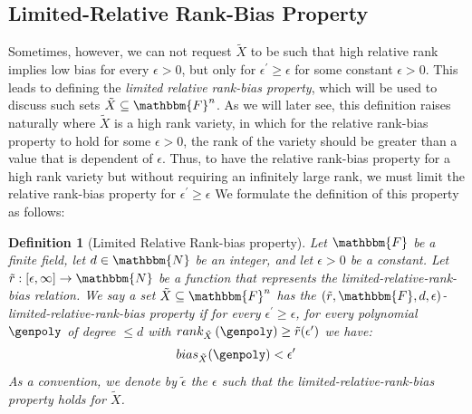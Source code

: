 \documentclass[10pt,a4paper]{article}
\newtheorem{definition}[theorem]{Definition}
\newcommand{\parens}[1]{\left( #1 \right)}
\newcommand{\basefield}[0]{\mathbbm{F}}
\newcommand{\blocklength}[0]{n}
\newcommand{\field}[0]{\basefield^{\blocklength}}
\newcommand{\degree}[0]{d}
\newcommand{\funcdef}[3]{#1:#2\rightarrow#3}
\newcommand{\naturalnumbersset}[0]{\mathbbm{N}}
\newcommand{\variety}{{\tilde{X}}}
\newcommand{\relrank}[2]{rank_{#1} \parens{#2}}
\newcommand{\rankbiasfunc}[0]{{\tilde{r}}}
\newcommand{\epsilonlimitedrankbias}[0]{{\tilde{\epsilon}}}
\newcommand{\relbias}[2]{bias_{#1}{({#2})}}
\begin{document}
\subsection[Limited Relative Rank-Bias Property]{Limited-Relative Rank-Bias Property}\label{subsec:limited-relative-rank-bias-property}
Sometimes, however, we can not request $\variety$ to be such that high relative rank implies low bias for every $\epsilon > 0$,
but only for $\epsilon^\prime \geq \epsilon$ for some constant $\epsilon > 0$.
This leads to defining the \emph{limited relative rank-bias property}, which will be used to discuss such sets $\variety \subseteq \field$.
\newline
As we will later see, this definition raises naturally where $\variety$ is a high rank variety,
in which for the relative rank-bias property to hold for some $\epsilon > 0$, the rank of the variety should be greater than a value that is dependent of $\epsilon$.
Thus, to have the relative rank-bias property for a high rank variety but without requiring an infinitely large rank, we must limit the relative rank-bias property for $\epsilon^\prime \geq \epsilon$
We formulate the definition of this property as follows:
\begin{definition}[Limited Relative Rank-bias property]
    Let $\basefield$ be a finite field, let $\degree \in \naturalnumbersset$ be an integer, and let $\epsilon > 0$ be a constant.
    Let $\funcdef{\rankbiasfunc}{[\epsilon, \infty]}{\naturalnumbersset}$ be a function that represents the limited-relative-rank-bias relation.
    \newline
    We say a set $\variety \subseteq \field$ has the \emph{$(\rankbiasfunc, \basefield, \degree, \epsilon)$-limited-relative-rank-bias property} if
    for every $\epsilon^\prime \geq \epsilon$,
    for every polynomial $\genpoly$ of degree $\leq \degree$ with $\relrank{\variety}{\genpoly} \geq \rankbiasfunc(\epsilon^\prime)$ we have:
    \[
        \relbias{\variety}{\genpoly} < \epsilon^{\prime}
    \]
    As a convention, we denote by $\epsilonlimitedrankbias$ the $\epsilon$ such that the limited-relative-rank-bias property holds for $\variety$.
\end{definition}

\end{document}
